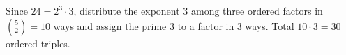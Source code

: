 Since $24=2^3\cdot3$, distribute the exponent 3 among three ordered factors in $\binom52=10$ ways and assign the prime 3 to a factor in 3 ways. Total $10\cdot3=\boxed{30}$ ordered triples.
